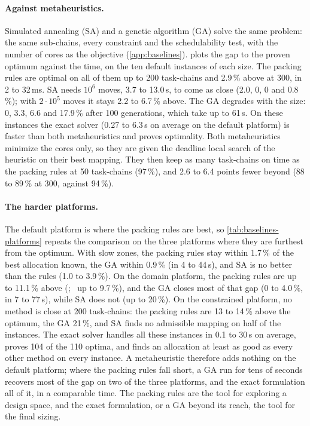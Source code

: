 \paragraph{Against metaheuristics.} Simulated annealing (SA) and a
genetic algorithm (GA) solve the same problem: the same sub-chains, every
constraint and the schedulability test, with the number of cores as the
objective (\cref{app:baselines}).  plots the gap to
the proven optimum against the time, on the ten default instances of each
size. The packing rules are optimal on all of them up to 200 task-chains
and 2.9\,\% above at 300, in 2 to 32\,ms. SA needs $10^6$ moves, 3.7 to
13.0\,s, to come as close (2.0, 0, 0 and 0.8\,\%); with $2\cdot10^5$
moves it stays 2.2 to 6.7\,\% above. The GA degrades with the size: 0,
3.3, 6.6 and 17.9\,\% after 100 generations, which take up to 61\,s.
On these instances the exact solver (0.27 to 6.3\,s on average on the
default platform) is faster than both metaheuristics and proves
optimality. Both metaheuristics minimize the cores only, so they are
given the deadline local search of the heuristic on their best mapping.
They then keep as many task-chains on time as the packing rules at 50
task-chains (97\,\%), and 2.6 to 6.4 points fewer beyond (88 to 89\,\% at
300, against 94\,\%).

\paragraph{The harder platforms.} The default platform is where the
packing rules are best, so \cref{tab:baselines-platforms} repeats the
comparison on the three platforms where they are furthest from the
optimum. With slow zones, the packing rules stay within 1.7\,\% of the
best allocation known, the GA within 0.9\,\% (in 4 to 44\,s), and SA is
no better than the rules (1.0 to 3.9\,\%). On the domain platform, the
packing rules are up to 11.1\,\% above (\FFDU; \BFDU\ up to 9.7\,\%),
and the GA closes most of that gap (0 to 4.0\,\%, in 7 to 77\,s), while
SA does not (up to 20\,\%). On the constrained
platform, no method is close at 200 task-chains: the packing rules are
13 to 14\,\% above the optimum, the GA 21\,\%, and SA finds no admissible
mapping on half of the instances. The exact solver handles all these
instances in 0.1 to 30\,s on average, proves 104 of the 110 optima, and
finds an allocation at least as good as every other method on every
instance. A metaheuristic therefore adds nothing on the default
platform; where the packing rules fall short, a GA run for tens of
seconds recovers most of the gap on two of the three platforms, and the
exact formulation all of it, in a comparable time. The packing rules
are the tool for exploring a design space, and the exact formulation, or
a GA beyond its reach, the tool for the final sizing.

